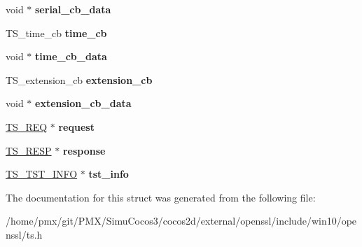 \begin{DoxyCompactItemize}
\item 
\mbox{\label{structTS__resp__ctx_a428e1ae893e00dea7088a4caed4ff52b}} 
void $\ast$ {\bfseries serial\+\_\+cb\+\_\+data}
\item 
\mbox{\label{structTS__resp__ctx_a838a0b82016f7bcf6aabe4102f1a4ac8}} 
T\+S\+\_\+time\+\_\+cb {\bfseries time\+\_\+cb}
\item 
\mbox{\label{structTS__resp__ctx_aa818a3e3400ed231cf9b6fb084fe5cd6}} 
void $\ast$ {\bfseries time\+\_\+cb\+\_\+data}
\item 
\mbox{\label{structTS__resp__ctx_a76759785bdc0835a4501abdd72954561}} 
T\+S\+\_\+extension\+\_\+cb {\bfseries extension\+\_\+cb}
\item 
\mbox{\label{structTS__resp__ctx_aa732cb381d3c1f66e3097adff0df24f0}} 
void $\ast$ {\bfseries extension\+\_\+cb\+\_\+data}
\item 
\mbox{\label{structTS__resp__ctx_a9c66652878d500b08d3c36e258a4d974}} 
\hyperlink{structTS__req__st}{T\+S\+\_\+\+R\+EQ} $\ast$ {\bfseries request}
\item 
\mbox{\label{structTS__resp__ctx_aff6fbaf908c062da548fb3e319d5ac68}} 
\hyperlink{structTS__resp__st}{T\+S\+\_\+\+R\+E\+SP} $\ast$ {\bfseries response}
\item 
\mbox{\label{structTS__resp__ctx_a314c23ef39b07c6119b982b9677c844e}} 
\hyperlink{structTS__tst__info__st}{T\+S\+\_\+\+T\+S\+T\+\_\+\+I\+N\+FO} $\ast$ {\bfseries tst\+\_\+info}
\end{DoxyCompactItemize}


The documentation for this struct was generated from the following file\+:\begin{DoxyCompactItemize}
\item 
/home/pmx/git/\+P\+M\+X/\+Simu\+Cocos3/cocos2d/external/openssl/include/win10/openssl/ts.\+h\end{DoxyCompactItemize}
